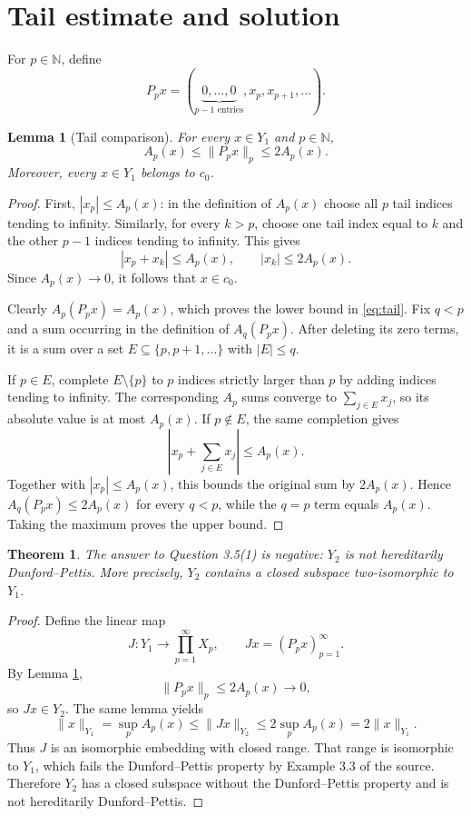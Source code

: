 \documentclass[11pt]{article}
\newtheorem{theorem}{Theorem}
\newtheorem{lemma}{Lemma}
\newcommand{\N}{\mathbb N}
\begin{document}
\section{Tail estimate and solution}

For $p\in\N$, define
\[
 P_p x=(\underbrace{0,\ldots,0}_{p-1\text{ entries}},x_p,x_{p+1},\ldots).
\]

\begin{lemma}[Tail comparison]\label{lem:tail}
For every $x\in Y_1$ and $p\in\N$,
\[
 A_p(x)\le \|P_p x\|_p\le 2A_p(x). \tag{1}\label{eq:tail}
\]
Moreover, every $x\in Y_1$ belongs to $c_0$.
\end{lemma}

\begin{proof}
First, $|x_p|\le A_p(x)$: in the definition of $A_p(x)$ choose all $p$ tail
indices tending to infinity. Similarly, for every $k>p$, choose one tail index
equal to $k$ and the other $p-1$ indices tending to infinity. This gives
\[
 |x_p+x_k|\le A_p(x),\qquad |x_k|\le2A_p(x).
\]
Since $A_p(x)\to0$, it follows that $x\in c_0$.

Clearly $A_p(P_p x)=A_p(x)$, which proves the lower bound in
\eqref{eq:tail}. Fix $q<p$ and a sum occurring in the definition of
$A_q(P_p x)$. After deleting its zero terms, it is a sum over a set
$E\subseteq\{p,p+1,\ldots\}$ with $|E|\le q$.

If $p\in E$, complete $E\setminus\{p\}$ to $p$ indices strictly larger than
$p$ by adding indices tending to infinity. The corresponding $A_p$ sums
converge to $\sum_{j\in E}x_j$, so its absolute value is at most $A_p(x)$.
If $p\notin E$, the same completion gives
\[
 \left|x_p+\sum_{j\in E}x_j\right|\le A_p(x).
\]
Together with $|x_p|\le A_p(x)$, this bounds the original sum by $2A_p(x)$.
Hence $A_q(P_p x)\le2A_p(x)$ for every $q<p$, while the $q=p$ term equals
$A_p(x)$. Taking the maximum proves the upper bound.
\end{proof}

\begin{theorem}\label{thm:answer}
The answer to Question 3.5(1) is negative: $Y_2$ is not hereditarily
Dunford--Pettis. More precisely, $Y_2$ contains a closed subspace two-isomorphic
to $Y_1$.
\end{theorem}

\begin{proof}
Define the linear map
\[
 J:Y_1\longrightarrow\prod_{p=1}^\infty X_p,
 \qquad Jx=(P_p x)_{p=1}^\infty.
\]
By Lemma \ref{lem:tail},
\[
 \|P_p x\|_p\le2A_p(x)\longrightarrow0,
\]
so $Jx\in Y_2$. The same lemma yields
\[
 \|x\|_{Y_1}=\sup_p A_p(x)
 \le \|Jx\|_{Y_2}
 \le2\sup_p A_p(x)=2\|x\|_{Y_1}.
\]
Thus $J$ is an isomorphic embedding with closed range. That range is isomorphic
to $Y_1$, which fails the Dunford--Pettis property by Example 3.3 of the source.
Therefore $Y_2$ has a closed subspace without the Dunford--Pettis property and
is not hereditarily Dunford--Pettis.
\end{proof}
\end{document}
